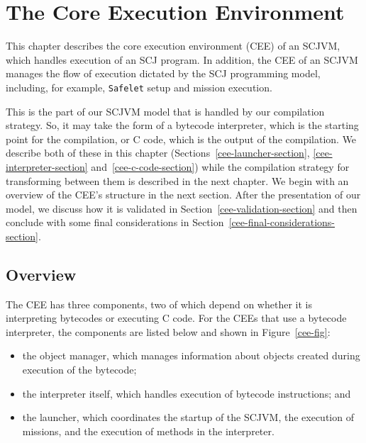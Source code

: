 \chapter{The Core Execution Environment}
\label{cee-chapter}

This chapter describes the core execution environment (CEE) of an
SCJVM, which handles execution of an SCJ program.
In addition, the CEE of an SCJVM manages the flow of execution
dictated by the SCJ programming model, including, for example,
\texttt{Safelet} setup and mission execution.

This is the part of our SCJVM model that is handled by our compilation
strategy. 
So, it may take the form of a bytecode interpreter, which is the
starting point for the compilation, or C code, which is the output of
the compilation.
We describe both of these in this chapter
(Sections~\ref{cee-launcher-section}, \ref{cee-interpreter-section}
and~\ref{cee-c-code-section}) while the compilation strategy for
transforming between them is described in the next chapter.
We begin with an overview of the CEE's structure in the next section.
After the presentation of our model, we discuss how it is validated in
Section~\ref{cee-validation-section} and then conclude with some final
considerations in Section~\ref{cee-final-considerations-section}.

\section{Overview}

The CEE has three components, two of which depend on whether it is
interpreting bytecodes or executing C code. 
For the CEEs that use a bytecode interpreter, the components are
listed below and shown in Figure~\ref{cee-fig}:
\begin{itemize}
\item the object manager, which manages information about objects
  created during execution of the bytecode;
\item the interpreter itself, which handles execution of bytecode
  instructions; and
\item the launcher, which coordinates the startup of the SCJVM, the
  execution of missions, and the execution of methods in the
  interpreter.
\end{itemize}

